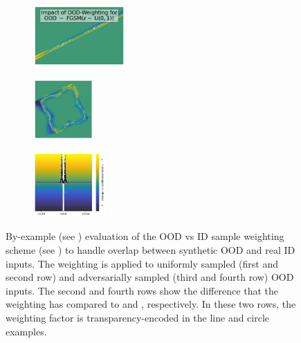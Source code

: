 \begin{figure}[H]
    \begin{subfigure}
        \centering
        \includegraphics[width=0.388\textwidth,valign=t]{ood-detection/figures/ood-synthesis/ood-line-uniform-fgsm-weighted-difference.pdf}
    \end{subfigure}
    \begin{subfigure}
        \centering
        \includegraphics[width=0.254\textwidth,valign=t]{ood-detection/figures/ood-synthesis/ood-circle-uniform-fgsm-weighted-difference.pdf}
    \end{subfigure}
    \begin{subfigure}
        \centering
        \includegraphics[width=0.308\textwidth,valign=t]{ood-detection/figures/ood-synthesis/ood-haystack-uniform-fgsm-weighted-difference.pdf}
    \end{subfigure}

    \caption[Weighted Random and Adversarial Synthetic OOD Samples]{By-example (see ) evaluation of the OOD vs ID sample weighting scheme (see ) to handle overlap between synthetic OOD and real ID inputs. The weighting is applied to uniformly sampled (first and second row) and adversarially sampled (third and fourth row) OOD inputs. The second and fourth rows show the difference that the weighting has compared to  and , respectively. In these two rows, the weighting factor is transparency-encoded in the line and circle examples.}
    \label{fig:weighted-ood-samples}
\end{figure}

